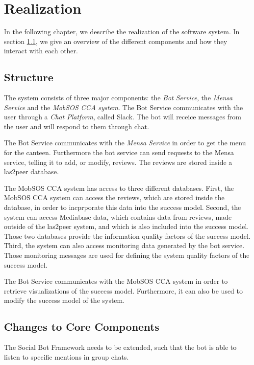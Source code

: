 \chapter{Realization}

In the following chapter, we describe the realization of the software system. In section \ref{sec:structure}, we give an overview of the different components and how they interact with each other.

\section{Structure}\label{sec:structure}

The system consists of three major components: the \emph{Bot Service}, the \emph{Mensa Service} and the \emph{MobSOS CCA system}. The Bot Service communicates with the user through a \emph{Chat Platform}, called Slack. The bot will receice messages from the user and will respond to them through chat.

The Bot Service communicates with the \emph{Mensa Service} in order to get the menu for the canteen. Furthermore the bot service can send requests to the Mensa service, telling it to add, or modify, reviews. The reviews are stored inside a las2peer database.

The MobSOS CCA system has access to three different databases. First, the MobSOS CCA system can access the reviews, which are stored inside the database, in order to incprporate this data into the success model.
Second, the system can access Mediabase data, which contains data from reviews, made outside of the las2peer system, and which is also included into the success model.
Those two databases provide the information quality factors of the success model.
Third, the system can also access monitoring data generated by the bot service. Those monitoring messages are used for defining the system quality factors of the success model.

The Bot Service communicates with the MobSOS CCA system in order to retrieve visualizations of the success model. Furthermore, it can also be used to modify the success model of the system.


\section{Changes to Core Components}

The Social Bot Framework needs to be extended, such that the bot is able to listen to specific mentions in group chats.
